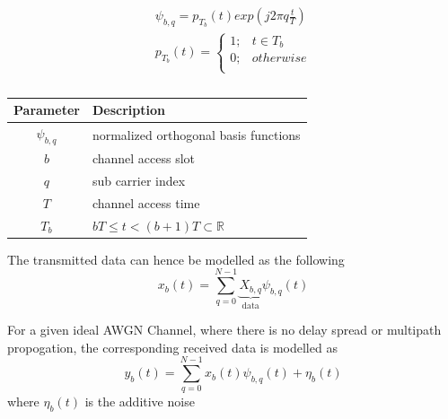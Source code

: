        \begin{equation} \label{eq:OFDM}
            \begin{split}
                \psi_{b,q} = p_{T_{b}}(t)exp(j2{\pi}q{\frac{t}{T}}) \\
                p_{T_{b}}(t) = \left\{
                    \begin{matrix}
                        1; & t \in T_b \\
                        0; & otherwise \\
                    \end{matrix}\right.
            \end{split}
        \end{equation}

        \begin{table}[H]
            \begin{center}
                \begin{tabular}{|c|l|}
                    \hline
                    Parameter& Description\\ \hline
                    $\psi_{b,q}$& normalized orthogonal basis functions\\ \hline
                    $b$& channel access slot\\ \hline
                    $q$& sub carrier index\\ \hline
                    $T$& channel access time \\ \hline
                    $T_{b}$& $ bT \leq t < (b + 1)T \subset \mathbb{R}$ \\ \hline
                \end{tabular}
                \caption{}
                \label{tab:OFDMParam}
            \end{center}
        \end{table}


        The transmitted data can hence be modelled as the following
        \begin{equation} \label{eq:TxDataMath}
            x_b(t) = \sum_{q=0}^{N-1}\underbrace{X_{b,q}}_\text{data} \psi_{b,q}(t)
        \end{equation}

        For a given ideal AWGN Channel, where there is no delay spread or multipath propogation, the corresponding received data is modelled as
        \begin{equation} \label{eq:RxDataMathIdeal}
            y_b(t) = \sum_{q=0}^{N-1}x_b(t) \psi_{b,q}(t) +\eta_b(t)
        \end{equation}
        where $\eta_b(t)$ is the additive noise

